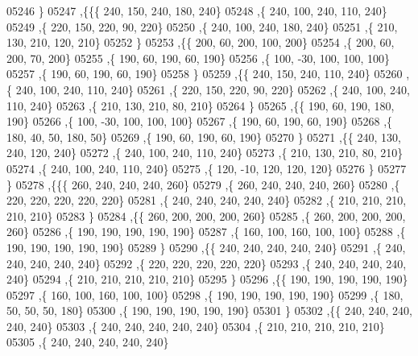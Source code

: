 \begin{DoxyCode}
05246    \}
05247   ,\{\{\{   240,   150,   240,   180,   240\}
05248     ,\{   240,   100,   240,   110,   240\}
05249     ,\{   220,   150,   220,    90,   220\}
05250     ,\{   240,   100,   240,   180,   240\}
05251     ,\{   210,   130,   210,   120,   210\}
05252     \}
05253    ,\{\{   200,    60,   200,   100,   200\}
05254     ,\{   200,    60,   200,    70,   200\}
05255     ,\{   190,    60,   190,    60,   190\}
05256     ,\{   100,   -30,   100,   100,   100\}
05257     ,\{   190,    60,   190,    60,   190\}
05258     \}
05259    ,\{\{   240,   150,   240,   110,   240\}
05260     ,\{   240,   100,   240,   110,   240\}
05261     ,\{   220,   150,   220,    90,   220\}
05262     ,\{   240,   100,   240,   110,   240\}
05263     ,\{   210,   130,   210,    80,   210\}
05264     \}
05265    ,\{\{   190,    60,   190,   180,   190\}
05266     ,\{   100,   -30,   100,   100,   100\}
05267     ,\{   190,    60,   190,    60,   190\}
05268     ,\{   180,    40,    50,   180,    50\}
05269     ,\{   190,    60,   190,    60,   190\}
05270     \}
05271    ,\{\{   240,   130,   240,   120,   240\}
05272     ,\{   240,   100,   240,   110,   240\}
05273     ,\{   210,   130,   210,    80,   210\}
05274     ,\{   240,   100,   240,   110,   240\}
05275     ,\{   120,   -10,   120,   120,   120\}
05276     \}
05277    \}
05278   ,\{\{\{   260,   240,   240,   240,   260\}
05279     ,\{   260,   240,   240,   240,   260\}
05280     ,\{   220,   220,   220,   220,   220\}
05281     ,\{   240,   240,   240,   240,   240\}
05282     ,\{   210,   210,   210,   210,   210\}
05283     \}
05284    ,\{\{   260,   200,   200,   200,   260\}
05285     ,\{   260,   200,   200,   200,   260\}
05286     ,\{   190,   190,   190,   190,   190\}
05287     ,\{   160,   100,   160,   100,   100\}
05288     ,\{   190,   190,   190,   190,   190\}
05289     \}
05290    ,\{\{   240,   240,   240,   240,   240\}
05291     ,\{   240,   240,   240,   240,   240\}
05292     ,\{   220,   220,   220,   220,   220\}
05293     ,\{   240,   240,   240,   240,   240\}
05294     ,\{   210,   210,   210,   210,   210\}
05295     \}
05296    ,\{\{   190,   190,   190,   190,   190\}
05297     ,\{   160,   100,   160,   100,   100\}
05298     ,\{   190,   190,   190,   190,   190\}
05299     ,\{   180,    50,    50,    50,   180\}
05300     ,\{   190,   190,   190,   190,   190\}
05301     \}
05302    ,\{\{   240,   240,   240,   240,   240\}
05303     ,\{   240,   240,   240,   240,   240\}
05304     ,\{   210,   210,   210,   210,   210\}
05305     ,\{   240,   240,   240,   240,   240\}

\end{DoxyCode}
